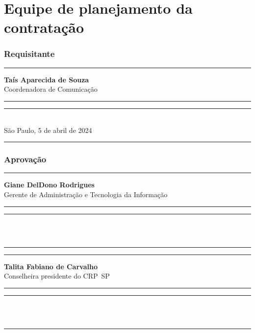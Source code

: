 \documentclass[oneside,a4paper,article]{memoir}
\begin{document}
\chapter*{Equipe de planejamento da contratação}

\subsection*{Requisitante}
\rule[0.5ex]{\linewidth}{0.8pt}
\normalsize\textbf{Taís Aparecida de Souza}\\
\footnotesize Coordenadora de Comunicação\\
\rule[0.5ex]{\linewidth}{0.4pt}\normalsize
\vspace*{3\baselineskip}
	
\noindent\rule{28em}{0.4pt}\\
	\footnotesize São Paulo, 5 de abril de 2024\\\normalsize
	\rule{\linewidth}{0.8pt}
	\vspace{0.62\baselineskip}

\subsection*{Aprovação}

\rule[0.5ex]{\linewidth}{0.8pt}
\normalsize\textbf{Giane Del\textquotesingle Dono Rodrigues}\\
\footnotesize Gerente de Administração e Tecnologia da Informação\\
\rule[0.5ex]{\linewidth}{0.4pt}\normalsize
\vspace*{3\baselineskip}
	
\noindent\rule{28em}{0.4pt}\\
\\
	\noindent\rule{\linewidth}{0.8pt}

	\noindent\rule[0.5ex]{\linewidth}{0.8pt}
\normalsize\textbf{Talita Fabiano de Carvalho}\\
\footnotesize Conselheira presidente do CRP~SP\\
\rule[0.5ex]{\linewidth}{0.4pt}\normalsize
\vspace*{3\baselineskip}
	
\noindent\rule{28em}{0.4pt}\\
\\
	\rule{\linewidth}{0.8pt}
\end{document}
